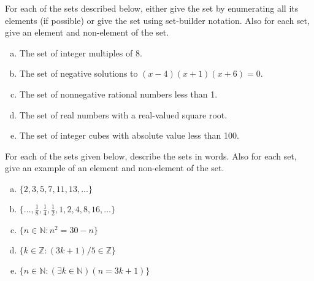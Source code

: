 \documentclass[11pt,letterpaper]{article}
\begin{document}

 For each of the sets described below, either give the set by enumerating all its elements (if possible) or give the set using set-builder notation. Also for each set, give an element and non-element of the set. 
	\begin{enumerate}[(a)]
	\item The set of integer multiples of 8. 
	\item The set of negative solutions to $(x - 4)(x + 1)(x + 6)= 0$.
	\item The set of nonnegative rational numbers less than 1. 
	\item The set of real numbers with a real-valued square root. 
	\item The set of integer cubes with absolute value less than 100.
	\end{enumerate}



\newpage



 For each of the sets given below, describe the sets in words. Also for each set, give an example of an element and non-element of the set.
	\begin{enumerate}[(a)]
	\item $\{ 2, 3, 5, 7, 11, 13, \ldots \}$
	\item $\{ \ldots, \frac{1}{8}, \frac{1}{4}, \frac{1}{2}, 1, 2, 4, 8, 16, \ldots \}$
	\item $\{ n \in \mathbb{N} \colon n^2= 30 - n \}$
	\item $\{ k \in \mathbb{Z} \colon (3k + 1)/5 \in \mathbb{Z} \}$
	\item $\{ n \in \mathbb{N} \colon (\exists k \in \mathbb{N})(n= 3k + 1) \}$
	\end{enumerate}



\newpage
\end{document}
